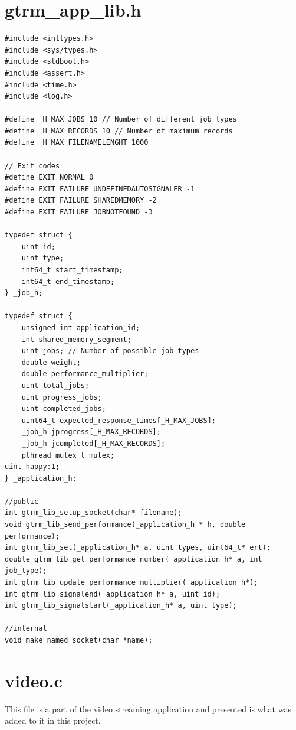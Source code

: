 \documentclass[nobiblatex]{LTHthesis}
\begin{document}
\section{gtrm\_app\_lib.h}
\begin{lstlisting}
#include <inttypes.h>
#include <sys/types.h>
#include <stdbool.h>
#include <assert.h>
#include <time.h>
#include <log.h>

#define _H_MAX_JOBS 10 // Number of different job types
#define _H_MAX_RECORDS 10 // Number of maximum records 
#define _H_MAX_FILENAMELENGHT 1000

// Exit codes
#define EXIT_NORMAL 0
#define EXIT_FAILURE_UNDEFINEDAUTOSIGNALER -1
#define EXIT_FAILURE_SHAREDMEMORY -2
#define EXIT_FAILURE_JOBNOTFOUND -3

typedef struct {
	uint id;
	uint type;
	int64_t start_timestamp;
	int64_t end_timestamp;
} _job_h;
  
typedef struct {
	unsigned int application_id;
	int shared_memory_segment;
	uint jobs; // Number of possible job types
	double weight;
	double performance_multiplier;
	uint total_jobs;
	uint progress_jobs;
	uint completed_jobs;
	uint64_t expected_response_times[_H_MAX_JOBS];
	_job_h jprogress[_H_MAX_RECORDS];
	_job_h jcompleted[_H_MAX_RECORDS];
	pthread_mutex_t mutex;
uint happy:1;
} _application_h;
  
//public
int gtrm_lib_setup_socket(char* filename);  
void gtrm_lib_send_performance(_application_h * h, double performance);
int gtrm_lib_set(_application_h* a, uint types, uint64_t* ert);
double gtrm_lib_get_performance_number(_application_h* a, int job_type);
int gtrm_lib_update_performance_multiplier(_application_h*);
int gtrm_lib_signalend(_application_h* a, uint id);
int gtrm_lib_signalstart(_application_h* a, uint type);

//internal
void make_named_socket(char *name);
\end{lstlisting}
\section{video.c}
This file is a part of the video streaming application and presented is what was added to it in this project.
\end{document}
